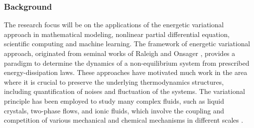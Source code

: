 \documentclass[11pt]{NSFamsart}
\begin{document}
\subsubsection*{Background} The research focus will be on the applications of the energetic variational approach in mathematical modeling, nonlinear partial differential equation, scientific computing and machine learning. The framework of energetic variational approach, originated from seminal works of Raleigh \cite{strutt1871some} and Onsager \cite{onsager1931reciprocal,onsager1931reciprocal2}, provides a paradigm to determine the dynamics of a non-equilibrium system from prescribed energy-dissipation laws.
These approaches have motivated much work in the area where it is crucial to preserve the underlying
thermodynamics structures, including quantification of noises and fluctuation of the systems.
The variational principle has been employed to study many complex fluids, such as liquid crystals, two-phase flows, and ionic fluids, which involve the coupling and competition of various mechanical and chemical mechanisms in different scales \cite{lin2001static, feng2005energetic, LiLiZh05, Lin2007, liu2009introduction, du2009energetic, sun2009energetic, eisenberg2010energy, Giga2017, Liu2019, knopf2020phase}.
\end{document}
